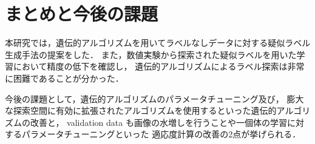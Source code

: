 \newpage
\changeindent{0cm}
\section{まとめと今後の課題}
\changeindent{2cm}
本研究では，遺伝的アルゴリズムを用いてラベルなしデータに対する疑似ラベル生成手法の提案をした．
また，数値実験から探索された疑似ラベルを用いた学習において精度の低下を確認し，
遺伝的アルゴリズムによるラベル探索は非常に困難であることが分かった．

今後の課題として，遺伝的アルゴリズムのパラメータチューニング及び，
膨大な探索空間に有効に拡張されたアルゴリズムを使用するといった遺伝的アルゴリズムの改善と，
validation data も画像の水増しを行うことや一個体の学習に対するパラメータチューニングといった
適応度計算の改善の2点が挙げられる．



